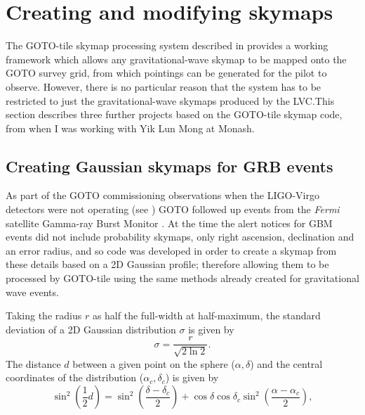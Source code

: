 
\newpage
\section{Creating and modifying skymaps}
\label{sec:custom_skymaps}
\begin{colsection}


\begin{colsection}

The GOTO-tile skymap processing system described in  provides a working framework which allows any gravitational-wave skymap to be mapped onto the GOTO survey grid, from which pointings can be generated for the pilot to observe. However, there is no particular reason that the system has to be restricted to just the gravitational-wave skymaps produced by the LVC.\@ This section describes three further projects based on the GOTO-tile skymap code, from when I was working with Yik Lun Mong at Monash.

\end{colsection}


\subsection{Creating Gaussian skymaps for GRB events}
\label{sec:grb_skymaps}
\begin{colsection}

As part of the GOTO commissioning observations when the LIGO-Virgo detectors were not operating (see ) GOTO followed up  events from the \textit{Fermi} satellite Gamma-ray Burst Monitor \citep[GBM;][]{Fermi_GBM}. At the time the alert notices for GBM events did not include probability skymaps, only right ascension, declination and an error radius, and so code was developed in order to create a skymap from these details based on a 2D Gaussian profile; therefore allowing them to be processed by GOTO-tile using the same methods already created for gravitational wave events.

Taking the radius $r$ as half the full-width at half-maximum, the standard deviation of a 2D Gaussian distribution $\sigma$ is given by
%
\begin{equation}
    \sigma = \frac{r}{\sqrt{2 \ln 2}}.
    \label{eq:gaussian_sigma}
\end{equation}
%
The distance $d$ between a given point on the sphere ($\alpha, \delta$) and the central coordinates of the distribution ($\alpha_c, \delta_c$) is given by
%
\begin{equation}
    \sin^2 \left ( \frac{1}{2} d \right )
    = \sin^2 \left ( \frac{\delta-\delta_c}{2} \right)
      + \cos \delta \cos \delta_c \sin^2 \left ( \frac{\alpha-\alpha_c}{2} \right),
    \label{eq:gaussian_distance}
\end{equation}


\end{colsection}
\end{colsection}
